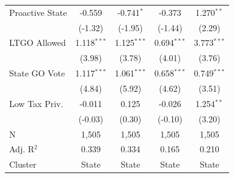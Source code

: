 \begin{tabular*}{\textwidth}{@{\extracolsep{\fill}}lcccc}
   Proactive State      & -0.559                    & -0.741$^{*}$                  & -0.373                               & 1.270$^{**}$\\   
                        & (-1.32)                  & (-1.95)                      & (-1.44)                             & (2.29)\\   
   LTGO Allowed         & 1.118$^{***}$             & 1.125$^{***}$                 & 0.694$^{***}$                        & 3.773$^{***}$\\   
                        & (3.98)                   & (3.78)                       & (4.01)                              & (3.76)\\   
   State GO Vote        & 1.117$^{***}$             & 1.061$^{***}$                 & 0.658$^{***}$                        & 0.749$^{***}$\\   
                        & (4.84)                   & (5.92)                       & (4.62)                              & (3.51)\\   
   Low Tax Priv.        & -0.011                    & 0.125                         & -0.026                               & 1.254$^{**}$\\   
                        & (-0.03)                  & (0.30)                       & (-0.10)                             & (3.20)\\   
   \hline
   N         & 1,505                     & 1,505                         & 1,505                                & 1,505\\  
   Adj. R$^2$       & 0.339                     & 0.334                         & 0.165                                & 0.210\\  
   Cluster              & State & State & State & State\\  
   \bottomrule
\end{tabular*}
\par\endgroup
